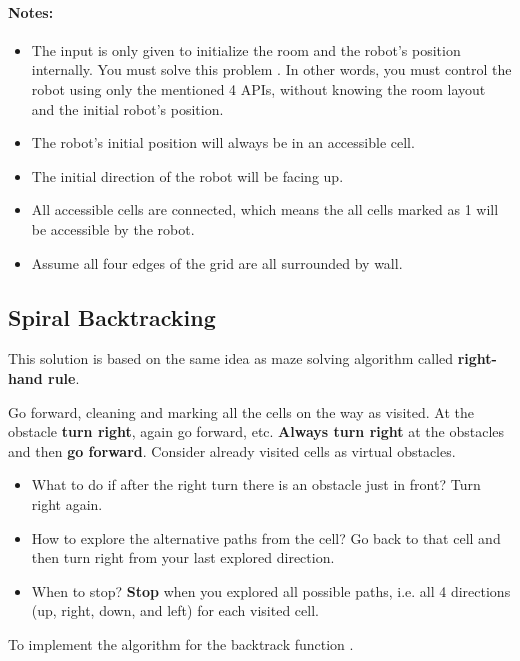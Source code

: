 \paragraph{Notes:}

\begin{itemize}
\item The input is only given to initialize the room and the robot's position internally. You must solve this problem . In other words, you must control the robot using only the mentioned 4 APIs, without knowing the room layout and the initial robot's position.
\item The robot's initial position will always be in an accessible cell.
\item The initial direction of the robot will be facing up.
\item All accessible cells are connected, which means the all cells marked as 1 will be accessible by the robot.
\item Assume all four edges of the grid are all surrounded by wall.
\end{itemize}

\subsection{Spiral Backtracking}
This solution is based on the same idea as maze solving algorithm called \textbf{right-hand rule}. 

Go forward, cleaning and marking all the cells on the way as visited. At the obstacle \textbf{turn right}, again go forward, etc. \textbf{Always turn right} at the obstacles and then \textbf{go forward}. Consider already visited cells as virtual obstacles.

\begin{itemize}
\item What to do if after the right turn there is an obstacle just in front? Turn right again.
\item How to explore the alternative paths from the cell? Go back to that cell and then turn right from your last explored direction.
\item When to stop? \textbf{Stop} when you explored all possible paths, i.e. all 4 directions (up, right, down, and left) for each visited cell. 
\end{itemize}

To implement the algorithm for the backtrack function .

